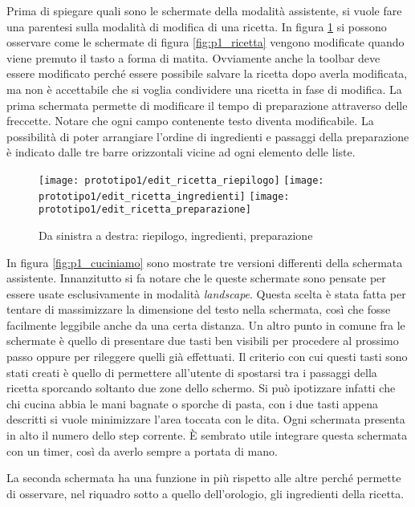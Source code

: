 \clearpage
Prima di spiegare quali sono le schermate della modalità assistente, si vuole fare una parentesi sulla modalità di modifica di una ricetta.
In figura \ref{fig:p1_edit_ricetta} si possono osservare come le schermate di figura \ref{fig:p1_ricetta} vengono modificate quando viene premuto il tasto a forma di matita.
Ovviamente anche la toolbar deve essere modificato perché essere possibile salvare la ricetta dopo averla modificata, ma non è accettabile che si voglia condividere una ricetta in fase di modifica.
La prima schermata permette di modificare il tempo di preparazione attraverso delle freccette.
Notare che ogni campo contenente testo diventa modificabile.
La possibilità di poter arrangiare l'ordine di ingredienti e passaggi della preparazione è indicato dalle tre barre orizzontali vicine ad ogni elemento delle liste.

\begin{figure}[ht]
  \begin{center}
    \texttt{[image: prototipo1/edit\_ricetta\_riepilogo]}
    \texttt{[image: prototipo1/edit\_ricetta\_ingredienti]}
    \texttt{[image: prototipo1/edit\_ricetta\_preparazione]}
    \caption{Da sinistra a destra: riepilogo, ingredienti, preparazione}
    \label{fig:p1_edit_ricetta}
  \end{center}
\end{figure}


In figura \ref{fig:p1_cuciniamo} sono mostrate tre versioni differenti della schermata assistente.
Innanzitutto si fa notare che le queste schermate sono pensate per essere usate esclusivamente in modalità \textit{landscape}.
Questa scelta è stata fatta per tentare di massimizzare la dimensione del testo nella schermata, così che fosse facilmente leggibile anche da una certa distanza.
Un altro punto in comune fra le schermate è quello di presentare due tasti ben visibili per procedere al prossimo passo oppure per rileggere quelli già effettuati.
Il criterio con cui questi tasti sono stati creati è quello di permettere all'utente di spostarsi tra i passaggi della ricetta sporcando soltanto due zone dello schermo.
Si può ipotizzare infatti che chi cucina abbia le mani bagnate o sporche di pasta, con i due tasti appena descritti si vuole minimizzare l'area toccata con le dita.
Ogni schermata presenta in alto il numero dello step corrente.
È sembrato utile integrare questa schermata con un timer, così da averlo sempre a portata di mano.

La seconda schermata ha una funzione in più rispetto alle altre perché permette di osservare, nel riquadro sotto a quello dell'orologio, gli ingredienti della ricetta.

